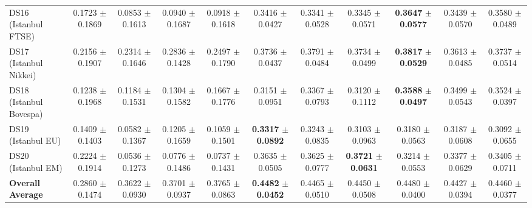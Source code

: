 \begin{table}[t]
{{\begin{tabular}{lcccccccccc}
DS16 (Istanbul FTSE) & 0.1723 $\pm$ 0.1869 & 0.0853 $\pm$ 0.1613 & 0.0940 $\pm$ 0.1687 & 0.0918 $\pm$ 0.1618 & 0.3416 $\pm$ 0.0427 & 0.3341 $\pm$ 0.0528 & 0.3345 $\pm$ 0.0571 & \textbf{0.3647} $\pm$ \textbf{0.0577} & 0.3439 $\pm$ 0.0570 & 0.3580 $\pm$ 0.0489 \\
DS17 (Istanbul Nikkei) & 0.2156 $\pm$ 0.1907 & 0.2314 $\pm$ 0.1646 & 0.2836 $\pm$ 0.1428 & 0.2497 $\pm$ 0.1790 & 0.3736 $\pm$ 0.0437 & 0.3791 $\pm$ 0.0484 & 0.3734 $\pm$ 0.0499 & \textbf{0.3817} $\pm$ \textbf{0.0529} & 0.3613 $\pm$ 0.0485 & 0.3737 $\pm$ 0.0514 \\
DS18 (Istanbul Bovespa) & 0.1238 $\pm$ 0.1968 & 0.1184 $\pm$ 0.1531 & 0.1304 $\pm$ 0.1582 & 0.1667 $\pm$ 0.1776 & 0.3151 $\pm$ 0.0951 & 0.3367 $\pm$ 0.0793 & 0.3120 $\pm$ 0.1112 & \textbf{0.3588} $\pm$ \textbf{0.0497} & 0.3499 $\pm$ 0.0543 & 0.3524 $\pm$ 0.0397 \\
DS19 (Istanbul EU) & 0.1409 $\pm$ 0.1403 & 0.0582 $\pm$ 0.1367 & 0.1205 $\pm$ 0.1659 & 0.1059 $\pm$ 0.1501 & \textbf{0.3317} $\pm$ \textbf{0.0892} & 0.3243 $\pm$ 0.0835 & 0.3103 $\pm$ 0.0963 & 0.3180 $\pm$ 0.0563 & 0.3187 $\pm$ 0.0608 & 0.3092 $\pm$ 0.0655 \\
DS20 (Istanbul EM) & 0.2224 $\pm$ 0.1914 & 0.0536 $\pm$ 0.1273 & 0.0776 $\pm$ 0.1486 & 0.0737 $\pm$ 0.1431 & 0.3635 $\pm$ 0.0505 & 0.3625 $\pm$ 0.0777 & \textbf{0.3721} $\pm$ \textbf{0.0631} & 0.3214 $\pm$ 0.0553 & 0.3377 $\pm$ 0.0629 & 0.3405 $\pm$ 0.0711 \\
\midrule
\textbf{Overall Average} & 0.2860 $\pm$ 0.1474 & 0.3622 $\pm$ 0.0930 & 0.3701 $\pm$ 0.0937 & 0.3765 $\pm$ 0.0863 & \textbf{0.4482} $\pm$ \textbf{0.0452} & 0.4465 $\pm$ 0.0510 & 0.4450 $\pm$ 0.0508 & 0.4480 $\pm$ 0.0400 & 0.4427 $\pm$ 0.0394 & 0.4460 $\pm$ 0.0377 \\
\bottomrule
\end{tabular}%
}%
}
\end{table}
